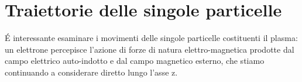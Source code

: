 \section{Traiettorie delle singole particelle}

\'E interessante esaminare i movimenti delle singole particelle costituenti il plasma: un elettrone percepisce l'azione di 
forze di natura elettro-magnetica prodotte dal campo elettrico auto-indotto e dal campo magnetico esterno, che stiamo continuando 
a considerare diretto lungo l'asse z.
